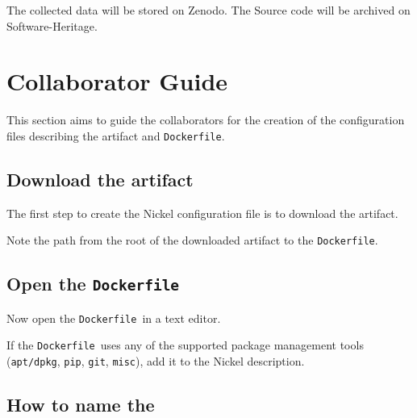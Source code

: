 \documentclass{article}
\newcommand{\dfile}{\texttt{Dockerfile}}
\begin{document}
The collected data will be stored on Zenodo.
The Source code will be archived on Software-Heritage.

\section{Collaborator Guide}

This section aims to guide the collaborators for the creation of the configuration files describing the artifact and \dfile.


\subsection{Download the artifact}

The first step to create the Nickel configuration file is to download the artifact.

Note the path from the root of the downloaded artifact to the \dfile.

\subsection{Open the \dfile}

Now open the \dfile\ in a text editor.

If the \dfile\ uses any of the supported package management tools (\texttt{apt/dpkg}, \texttt{pip}, \texttt{git}, \texttt{misc}), add it to the Nickel description.


\subsection{How to name the }

\printbibliography
\end{document}
